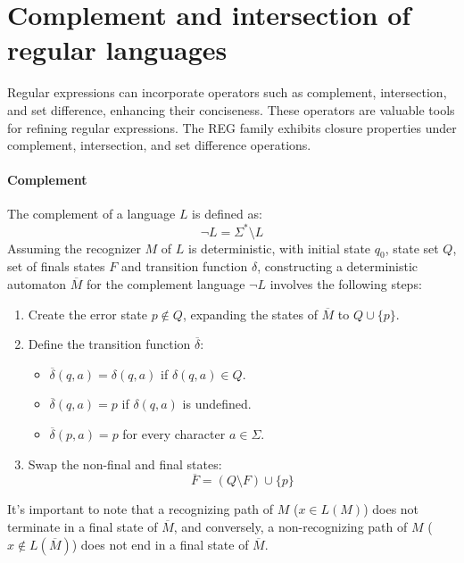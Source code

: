 \section{Complement and intersection of regular languages}

Regular expressions can incorporate operators such as complement, intersection, and set difference, enhancing their conciseness. 
These operators are valuable tools for refining regular expressions. 
The REG family exhibits closure properties under complement, intersection, and set difference operations.

\paragraph*{Complement}
The complement of a language $L$ is defined as: 
\[\lnot L = \Sigma^{\ast} \setminus L\]
Assuming the recognizer $M$ of $L$ is deterministic, with initial state $q_0$, state set $Q$, set of finals states $F$ and transition function $\delta$, constructing a deterministic automaton $\overline{M}$ for the complement language $\lnot L$ involves the following steps:
\begin{enumerate}
    \item Create the error state $p \notin Q$, expanding the states of $\overline{M}$ to $Q \cup \{ p \}$. 
    \item Define the transition function $\overline{\delta}$: 
        \begin{itemize}
            \item $\overline{\delta}(q,a)=\delta(q,a)$ if $\delta(q,a) \in Q$. 
            \item $\overline{\delta}(q,a)=p$ if $\delta(q,a)$ is undefined. 
            \item $\overline{\delta}(p,a)=p$ for every character $a \in \Sigma$. 
        \end{itemize}
    \item Swap the non-final and final states:
        \[\overline{F}=(Q \setminus F) \cup \{p\}\]
\end{enumerate}
It's important to note that a recognizing path of $M$ ($x \in L(M)$) does not terminate in a final state of $\overline{M}$, and conversely, a non-recognizing path of $M$ ($x \notin L(\overline{M})$) does not end in a final state of $\overline{M}$.
